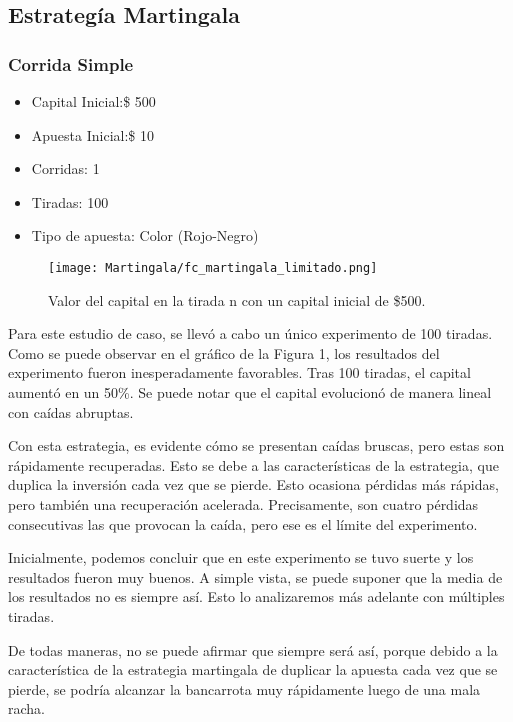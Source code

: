 \documentclass{article}
\begin{document}
\subsection{Estrategía Martingala}
\subsubsection{Corrida Simple}

\begin{itemize}
\item Capital Inicial:\$ 500
\item Apuesta Inicial:\$ 10
\item Corridas: 1
\item Tiradas: 100
\item Tipo de apuesta: Color (Rojo-Negro)
\end{itemize}

    \begin{figure} [h]
        \centering
            \texttt{[image: Martingala/fc\_martingala\_limitado.png]}
            \caption{Valor del capital en la tirada n con un capital inicial de \$500.}
            \label{fig:grafico}
    \end{figure}

Para este estudio de caso, se llevó a cabo un único experimento de 100 tiradas. Como se puede observar en el gráfico de la Figura 1, los resultados del experimento fueron inesperadamente favorables. Tras 100 tiradas, el capital aumentó en un 50\%. Se puede notar que el capital evolucionó de manera lineal con caídas abruptas.

Con esta estrategia, es evidente cómo se presentan caídas bruscas, pero estas son rápidamente recuperadas. Esto se debe a las características de la estrategia, que duplica la inversión cada vez que se pierde. Esto ocasiona pérdidas más rápidas, pero también una recuperación acelerada. Precisamente, son cuatro pérdidas consecutivas las que provocan la caída, pero ese es el límite del experimento.

Inicialmente, podemos concluir que en este experimento se tuvo suerte y los resultados fueron muy buenos. A simple vista, se puede suponer que la media de los resultados no es siempre así. Esto lo analizaremos más adelante con múltiples tiradas.

De todas maneras, no se puede afirmar que siempre será así, porque debido a la característica de la estrategia martingala de duplicar la apuesta cada vez que se pierde, se podría alcanzar la bancarrota muy rápidamente luego de una mala racha.
   
\end{document}
